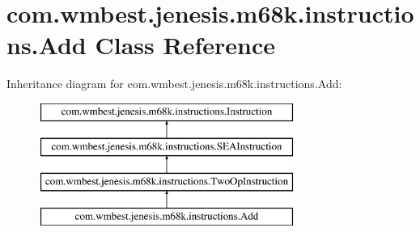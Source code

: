\hypertarget{classcom_1_1wmbest_1_1jenesis_1_1m68k_1_1instructions_1_1Add}{\section{com.\-wmbest.\-jenesis.\-m68k.\-instructions.\-Add Class Reference}
\label{classcom_1_1wmbest_1_1jenesis_1_1m68k_1_1instructions_1_1Add}
}
Inheritance diagram for com.\-wmbest.\-jenesis.\-m68k.\-instructions.\-Add\-:\begin{figure}[H]
\begin{center}
\leavevmode
\includegraphics[height=4.000000cm]{classcom_1_1wmbest_1_1jenesis_1_1m68k_1_1instructions_1_1Add}
\end{center}
\end{figure}
